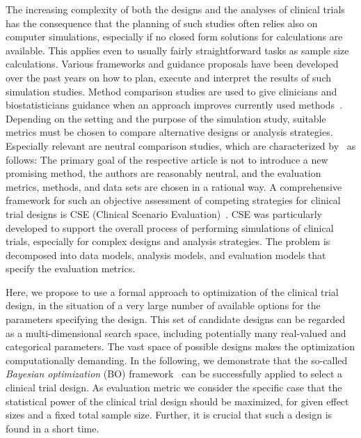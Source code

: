 \documentclass[bimj,fleqn]{w-art}
\theoremstyle{plain}
\theoremstyle{definition}
\begin{document}
The increasing complexity of both the designs and the analyses of clinical trials has the consequence that the planning of such studies often relies also on computer simulations, especially if no closed form solutions for calculations are available.
This applies even to usually fairly straightforward tasks as sample size calculations. 
Various frameworks and guidance proposals have been developed over the past years on how to plan, execute and interpret the results of such simulation studies.
Method comparison studies are used to give clinicians and biostatisticians guidance when an approach improves currently used methods~\citep{hanneman_design_2008}.  
Depending on the setting and the purpose of the simulation study, suitable metrics must be chosen to compare alternative designs or analysis strategies. 
Especially relevant are neutral comparison studies, which are characterized by~\citet{boulesteix_plea_2013} as follows:
The primary goal of the respective article is not to introduce a new promising method, the authors are reasonably neutral, and the evaluation metrics, methods, and data sets are chosen in a rational way.
A comprehensive framework for such an objective assessment of competing strategies for clinical trial designs is CSE (Clinical Scenario Evaluation)~\citep{benda_aspects_2010,friede_refinement_2010}.
CSE was particularly developed to support the overall process of performing simulations of clinical trials, especially for complex designs and analysis strategies.
The problem is decomposed into data models, analysis models, and evaluation models that specify the evaluation metrics.

Here, we propose to use a formal approach to optimization of the clinical trial design, in the situation of a very large number of available options for the parameters specifying the design. 
This set of candidate designs can be regarded as a multi-dimensional search space, including potentially many real-valued and categorical parameters.
The vast space of possible designs makes the optimization computationally demanding.
In the following, we demonstrate that the so-called \emph{Bayesian optimization} (BO) framework~\citep{jones_taxonomy_2001} can be successfully applied to select a clinical trial design.
As evaluation metric we consider the specific case that the statistical power of the clinical trial design should be maximized, for given effect sizes and a fixed total sample size.
Further, it is crucial that such a design is found in a short time.
\end{document}
